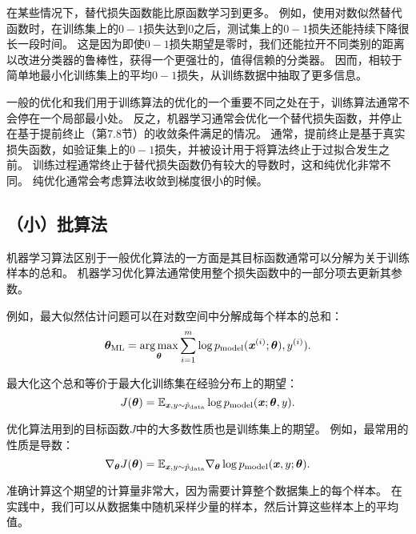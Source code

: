 
在某些情况下，替代损失函数能比原函数学习到更多。
例如，使用对数似然替代函数时，在训练集上的$0-1$损失达到$0$之后，测试集上的$0-1$损失还能持续下降很长一段时间。
这是因为即使$0-1$损失期望是零时，我们还能拉开不同类别的距离以改进分类器的鲁棒性，获得一个更强壮的，值得信赖的分类器。
因而，相较于简单地最小化训练集上的平均$0-1$损失，从训练数据中抽取了更多信息。

一般的优化和我们用于训练算法的优化的一个重要不同之处在于，训练算法通常不会停在一个局部最小处。
反之，机器学习通常会优化一个替代损失函数，并停止在基于提前终止（第7.8节）的收敛条件满足的情况。
通常，提前终止是基于真实损失函数，如验证集上的$0-1$损失，并被设计用于将算法终止于过拟合发生之前。
训练过程通常终止于替代损失函数仍有较大的导数时，这和纯优化非常不同。
纯优化通常会考虑算法收敛到梯度很小的时候。

\subsection{（小）批算法}
\label{sec:batch_and_minibatch_algorithms}
机器学习算法区别于一般优化算法的一方面是其目标函数通常可以分解为关于训练样本的总和。
机器学习优化算法通常使用整个损失函数中的一部分项去更新其参数。

例如，最大似然估计问题可以在对数空间中分解成每个样本的总和：
\begin{equation}
\label{eq:8.4}
    \boldsymbol{\theta}_{\text{ML}} = \underset{\boldsymbol{\theta}}{\arg\max} \sum_{i=1}^m
    \log p_{\text{model}} (\boldsymbol{\mathit{x}}^{(i)}; \boldsymbol{\theta}), y^{(i)}) .
\end{equation}

最大化这个总和等价于最大化训练集在经验分布上的期望：
\begin{equation}
\label{eq:8.5}
    J(\boldsymbol{\theta}) = \mathbb{E}_{\boldsymbol{\mathit{x}}, y \sim\hat{p}_\text{data}} 
    \log p_{\text{model}} (\boldsymbol{\mathit{x}}; \boldsymbol{\theta}, y) .
\end{equation}


优化算法用到的目标函数$J$中的大多数性质也是训练集上的期望。
例如，最常用的性质是导数：
\begin{equation}
\label{eq:8.6}
    \nabla_{\boldsymbol{\theta}} J(\boldsymbol{\theta}) = \mathbb{E}_{\boldsymbol{\mathit{x}}, y \sim\hat{p}_{\text{data}}} 
    \nabla_{\boldsymbol{\theta}} \log p_{\text{model}} (\boldsymbol{\mathit{x}},y; \boldsymbol{\theta}) .
\end{equation}

准确计算这个期望的计算量非常大，因为需要计算整个数据集上的每个样本。
在实践中，我们可以从数据集中随机采样少量的样本，然后计算这些样本上的平均值。

